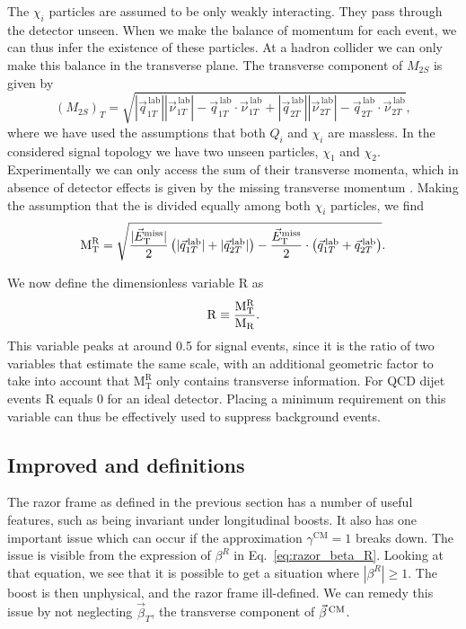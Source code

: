 The $\chi_i$ particles are assumed to be only weakly interacting. They pass through the detector
unseen. When we make the balance of momentum for each event, we can thus infer the existence of
these particles. At a hadron collider we can only make this balance in the transverse plane. The
transverse component of $M_{2S}$ is given by
\begin{equation}
  (M_{2S})_T = \sqrt{ |\vec{q}^{\,\textrm{lab}}_{1T}| |\vec{\nu}^{\,\textrm{lab}}_{1T}| -
\vec{q}^{\,\textrm{lab}}_{1T} \cdot \vec{\nu}^{\,\textrm{lab}}_{1T} 
                  + |\vec{q}^{\,\textrm{lab}}_{2T}| |\vec{\nu}^{\,\textrm{lab}}_{2T}| -
\vec{q}^{\,\textrm{lab}}_{2T} \cdot \vec{\nu}^{\,\textrm{lab}}_{2T}} ,
\end{equation}
where we have used the assumptions that both $Q_i$ and $\chi_i$ are massless. 
In the considered signal topology we have two unseen particles, $\chi_1$ and $\chi_2$.
Experimentally we can only access the sum of their transverse momenta, which in absence of detector
effects is given by the missing transverse momentum \VEtmiss. Making the assumption that the
\VEtmiss is divided equally among both $\chi_i$ particles, we find
\begin{equation}
  \mathrm{M_T^R} = \sqrt{\frac{|{\vec E}_{\mathrm{T}}^{\text{miss}}|}{2} \left(|\vec{q}^{\,\textrm{lab}}_{1T}| +
|\vec{q}^{\,\textrm{lab}}_{2T}| \right) - \frac{{\vec E}_{\mathrm{T}}^{\text{miss}}}{2} \cdot
\left(\vec{q}^{\,\textrm{lab}}_{1T} + \vec{q}^{\,\textrm{lab}}_{2T} \right)} .
\end{equation}

We now define the dimensionless variable $\mathrm{R}$ as
\begin{equation}
  \mathrm{R} \equiv \frac{\mathrm{M_T^R}}{\mathrm{M_R}} .
\end{equation}
This variable peaks at around 0.5 for signal events, since it is the ratio of two variables that
estimate the same scale, with an additional geometric factor to take into account that
$\mathrm{M_T^R}$ only contains transverse information. For QCD dijet events $\mathrm{R}$ equals 0
for an ideal detector. Placing a minimum requirement on this variable can thus
be effectively used to suppress background events.


\subsection{Improved \texorpdfstring{\mr and \rsq}{MR and R2} definitions
\label{sec:razor_mr_r2_improved}}

The razor frame as defined in the previous section has a number of useful features, such as \mr
being invariant under longitudinal boosts. It also has one important issue which can occur if the
approximation $\gamma^{\textrm{CM}} = 1$ breaks down. The issue is visible from the expression of
$\beta^R$ in Eq.~\ref{eq:razor_beta_R}. Looking at that equation, we see that it is possible to get
a situation where $|\beta^R| \geq 1$. The boost is then unphysical, and the razor frame ill-defined.
We can remedy this issue by not neglecting $\vec{\beta}_T$, the transverse component of
$\vec{\beta}^{\,\textrm{CM}}$. 


